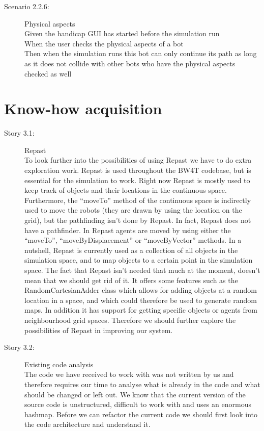 \documentclass{article}
\begin{document}
\begin{description}
\begin{description}
		\item[Scenario 2.2.6:] Physical aspects\\
		Given the handicap GUI has started before the simulation run\\
		When the user checks the physical aspects of a bot\\
		Then when the simulation runs this bot can only continue its path as long as it does not collide with other bots who have the physical aspects checked as well
	\end{description}
\end{description}
\section{Know-how acquisition}
\begin{description}
\item[Story 3.1:] Repast\\
To look further into the possibilities of using Repast we have to do extra exploration work.
Repast is used throughout the BW4T codebase, but is essential for the simulation to work.
Right now Repast is mostly used to keep track of objects and their locations in the continuous space.
Furthermore, the ``moveTo'' method of the continuous space is indirectly used to move the robots (they are drawn by using the location on the grid), but the pathfinding isn't done by Repast.
In fact, Repast does not have a pathfinder.
In Repast agents are moved by using either the ``moveTo'', ``moveByDisplacement'' or ``moveByVector'' methods.
In a nutshell, Repast is currently used as a collection of all objects in the simulation space, and to map objects to a certain point in the simulation space.
The fact that Repast isn't needed that much at the moment, doesn't mean that we should get rid of it.
It offers some features such as the RandomCartesianAdder class which allows for adding objects at a random location in a space, and which could therefore be used to generate random maps.
In addition it has support for getting specific objects or agents from neighbourhood grid spaces.
Therefore we should further explore the possibilities of Repast in improving our system.
\end{description}

\begin{description}
\item[Story 3.2:] Existing code analysis\\
The code we have received to work with was not written by us and therefore requires our time to analyse what is already in the code and what should be changed or left out.
We know that the current version of the source code is unstructured, difficult to work with and uses an enormous hashmap.
Before we can refactor the current code we should first look into the code architecture and understand it.
\end{description}
\end{document}
